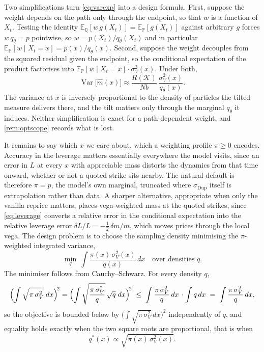 \documentclass[11pt,a4paper]{article}
\theoremstyle{plain}
\theoremstyle{definition}
\theoremstyle{definition}
\newcommand{\E}{\mathbb{E}}
\newcommand{\Pm}{\mathbb{P}}
\newcommand{\Qm}{\mathbb{Q}}
\newcommand{\sigDup}{\sigma_{\mathrm{Dup}}}
\newcommand{\Lev}{L}
\begin{document}
Two simplifications turn \cref{eq:varexp} into a design formula. First, suppose the weight depends on the path only through the endpoint, so that $w$ is a function of $X_t$. Testing the identity $\E_{\Qm}[w\,g(X_t)] = \E_{\Pm}[g(X_t)]$ against arbitrary $g$ forces $w\,q_\theta = p$ pointwise, so $w = p(X_t)/q_\theta(X_t)$ and in particular $\E_{\Pm}[w \mid X_t = x] = p(x)/q_\theta(x)$. Second, suppose the weight decouples from the squared residual given the endpoint, so the conditional expectation of the product factorises into $\E_{\Pm}[w \mid X_t = x] \cdot \sigma_V^2(x)$. Under both,
\begin{equation}\label{eq:designformula}
  \operatorname{Var}\bigl[\widehat m(x)\bigr]
  \approx \frac{R(\mathcal{K})}{Nb}\,\frac{\sigma_V^2(x)}{q_\theta(x)} .
\end{equation}
The variance at $x$ is inversely proportional to the density of particles the tilted measure delivers there, and the tilt matters only through the marginal $q_\theta$ it induces. Neither simplification is exact for a path-dependent weight, and \cref{rem:optscope} records what is lost.

It remains to say which $x$ we care about, which a weighting profile $\pi \geq 0$ encodes. Accuracy in the leverage matters essentially everywhere the model visits, since an error in $\Lev$ at every $x$ with appreciable mass distorts the dynamics from that time onward, whether or not a quoted strike sits nearby. The natural default is therefore $\pi = p$, the model's own marginal, truncated where $\sigDup$ itself is extrapolation rather than data. A sharper alternative, appropriate when only the vanilla reprice matters, places vega-weighted mass at the quoted strikes, since \cref{eq:leverage} converts a relative error in the conditional expectation into the relative leverage error $\delta\Lev/\Lev = -\tfrac12\,\delta m/m$, which moves prices through the local vega. The design problem is to choose the sampling density minimising the $\pi$-weighted integrated variance,
\[
  \min_{q}\ \int \frac{\pi(x)\,\sigma_V^2(x)}{q(x)}\,dx
  \quad \text{over densities } q .
\]
The minimiser follows from Cauchy--Schwarz. For every density $q$,
\[
  \Bigl( \int \sqrt{\pi\,\sigma_V^2}\;dx \Bigr)^{\!2}
  = \Bigl( \int \sqrt{\frac{\pi\,\sigma_V^2}{q}}\,\sqrt{q}\;dx \Bigr)^{\!2}
  \;\leq\; \int \frac{\pi\,\sigma_V^2}{q}\,dx \,\cdot \int q\,dx
  \;=\; \int \frac{\pi\,\sigma_V^2}{q}\,dx ,
\]
so the objective is bounded below by $\bigl(\int \sqrt{\pi\,\sigma_V^2}\,dx\bigr)^2$ independently of $q$, and equality holds exactly when the two square roots are proportional, that is when
\begin{equation}\label{eq:optdesign}
  q^*(x) \propto \sqrt{\pi(x)\,\sigma_V^2(x)} .
\end{equation}
\end{document}
